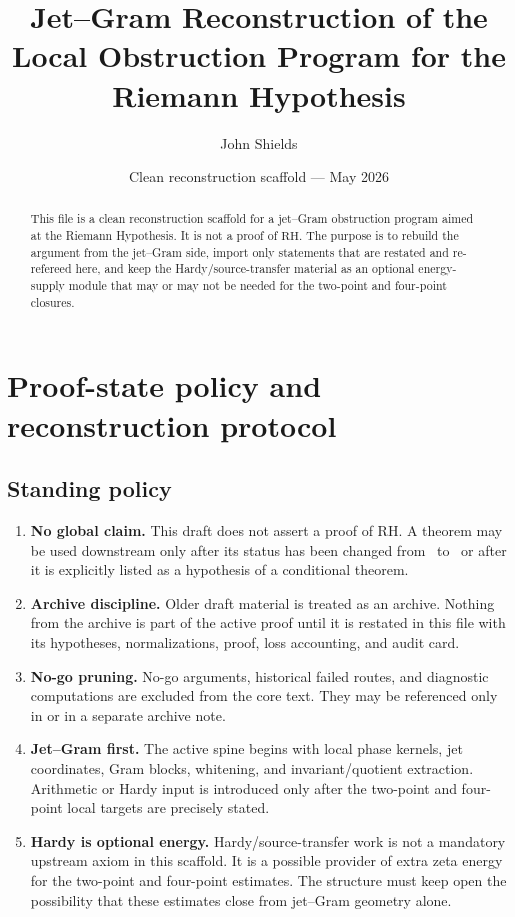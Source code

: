 \documentclass[11pt,a4paper]{amsart}
\title{Jet--Gram Reconstruction of the Local Obstruction Program for the Riemann Hypothesis}
\author{John Shields}
\date{Clean reconstruction scaffold --- May 2026}
\newcommand{\Status}[1]{\textnormal{\fbox{\scriptsize\textsf{#1}}}}
\newcommand{\Open}{\Status{OPEN}}
\newcommand{\Verified}{\Status{VERIFIED}}
\newcommand{\RH}{\mathrm{RH}}
\theoremstyle{plain}
\theoremstyle{definition}
\begin{document}
\begin{abstract}
This file is a clean reconstruction scaffold for a jet--Gram obstruction program aimed at the Riemann Hypothesis.  It is not a proof of \(\RH\).  The purpose is to rebuild the argument from the jet--Gram side, import only statements that are restated and re-refereed here, and keep the Hardy/source-transfer material as an optional energy-supply module that may or may not be needed for the two-point and four-point closures.
\end{abstract}

\maketitle
\tableofcontents

\section{Proof-state policy and reconstruction protocol}
\label{sec:protocol}

\subsection{Standing policy}
\label{subsec:standing-policy}

\begin{enumerate}[label=\textup{P\arabic*.},leftmargin=*]
\item \textbf{No global claim.}  This draft does not assert a proof of \(\RH\).  A theorem may be used downstream only after its status has been changed from \Open\ to \Verified\ or after it is explicitly listed as a hypothesis of a conditional theorem.
\item \textbf{Archive discipline.}  Older draft material is treated as an archive.  Nothing from the archive is part of the active proof until it is restated in this file with its hypotheses, normalizations, proof, loss accounting, and audit card.
\item \textbf{No-go pruning.}  No-go arguments, historical failed routes, and diagnostic computations are excluded from the core text.  They may be referenced only in  or in a separate archive note.
\item \textbf{Jet--Gram first.}  The active spine begins with local phase kernels, jet coordinates, Gram blocks, whitening, and invariant/quotient extraction.  Arithmetic or Hardy input is introduced only after the two-point and four-point local targets are precisely stated.
\item \textbf{Hardy is optional energy.}  Hardy/source-transfer work is not a mandatory upstream axiom in this scaffold.  It is a possible provider of extra zeta energy for the two-point and four-point estimates.  The structure must keep open the possibility that these estimates close from jet--Gram geometry alone.
\end{enumerate}
\end{document}
